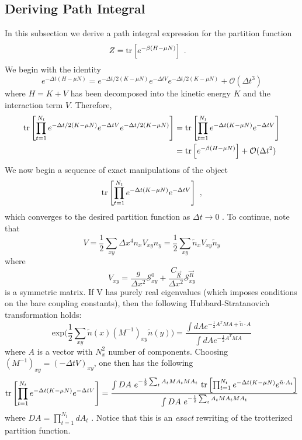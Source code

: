 \subsection{Deriving Path Integral}
In this subsection we derive a path integral expression for the partition function
\begin{align}
	Z
	&=
	\text{tr}\left[e^{-\beta(H-\mu N)}\right]~.
\end{align}
We begin with the identity
\begin{equation}
e^{-\Delta t(H - \mu N)} = e^{-\Delta t/2(K - \mu N)}  e^{-\Delta t V}  e^{-\Delta t/2(K - \mu N)} + \mathcal{O}(\Delta t^3) 
\end{equation}
where $H = K + V$ has been decomposed into the kinetic energy $K$ and the interaction term $V$. Therefore,
\begin{align}
\text{tr}\left[\prod_{t=1}^{N_t} e^{-\Delta t/2(K - \mu N)}  e^{-\Delta t V}  e^{-\Delta t/2(K - \mu N)}\right] & =
\text{tr}\left[\prod_{t=1}^{N_t} e^{-\Delta t(K - \mu N)}  e^{-\Delta t V}  \right] \\
& =  \text{tr}\left[e^{-\beta(H-\mu N)}\right] + \mathcal{O}(\Delta t^2)
\end{align}
We now begin a sequence of exact manipulations of the object 
\begin{equation}
\text{tr}\left[\prod_{t=1}^{N_t} e^{-\Delta t(K - \mu N)}  e^{-\Delta t V}  \right]~,
\end{equation}
which converges to the desired partition function as $\Delta t \rightarrow 0$ . To continue, note that
\begin{equation}
V =  \frac{1}{2} \sum_{xy} \Delta x^4 n_x V_{xy} n_y = \frac{1}{2} \sum_{xy} \tilde{n}_x V_{xy} \tilde{n}_y 
\end{equation}
where 
\begin{equation}
V_{xy} = \frac{g}{\Delta x^2} \mathcal{S}^0_{x y} + \frac{C_{ \vec{R} }}{\Delta x^2} \mathcal{S}^{ \vec{R} }_{xy}
\end{equation}
is a symmetric matrix. If V has purely real eigenvalues (which imposes conditions on the bare coupling constants), then the following Hubbard-Stratanovich transformation holds:
\begin{equation}
\text{exp}\Bigg( \frac{1}{2} \sum_{x y}\tilde{n}(x) (M^{-1})_{xy} \tilde{n}(y) \Bigg) 
= 
\frac{\int d {A} e^{-\frac{1}{2} {A}^T M A + \tilde{n} \cdot {A} } }{ \int d {A} e^{-\frac{1}{2} {A}^T M A  } }
\end{equation}
where $A$ is a vector with $N_x^2$ number of components. Choosing $(M^{-1})_{xy} = (-\Delta t V)_{xy}$, one then has the following
\begin{equation}
\text{tr}\left[\prod_{t=1}^{N_t} e^{-\Delta t(K - \mu N)}  e^{-\Delta t V}  \right] = 
\frac{  
\int DA ~ e^{-\frac{1}{2} \sum_t {A}_t M {A}_t M A_t} ~ \text{tr}\left[\prod_{t=1}^{N_t} e^{-\Delta t(K - \mu N)}  e^{ \tilde{n}\cdot A_t} \right] 
}{ 
\int DA ~ e^{-\frac{1}{2} \sum_t {A}_t M {A}_t M A_t}  
}
\end{equation}
where $DA = \prod_{t=1}^{N_t} d A_t $ . Notice that this is an \emph{exact} rewriting of the trotterized partition function.


